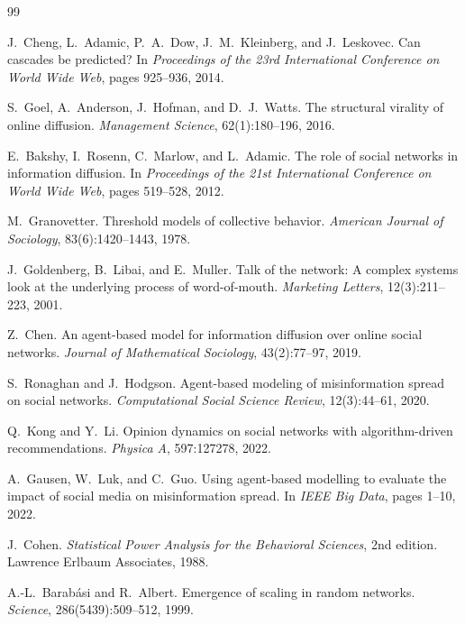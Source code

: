 \documentclass[sigconf, nonacm]{acmart}
\begin{document}

\begin{thebibliography}{99}

J.~Cheng, L.~Adamic, P.~A.~Dow, J.~M.~Kleinberg, and J.~Leskovec.
\newblock Can cascades be predicted?
\newblock In \emph{Proceedings of the 23rd International Conference on
World Wide Web}, pages 925--936, 2014.

S.~Goel, A.~Anderson, J.~Hofman, and D.~J.~Watts.
\newblock The structural virality of online diffusion.
\newblock \emph{Management Science}, 62(1):180--196, 2016.

E.~Bakshy, I.~Rosenn, C.~Marlow, and L.~Adamic.
\newblock The role of social networks in information diffusion.
\newblock In \emph{Proceedings of the 21st International Conference on
World Wide Web}, pages 519--528, 2012.

M.~Granovetter.
\newblock Threshold models of collective behavior.
\newblock \emph{American Journal of Sociology}, 83(6):1420--1443, 1978.

J.~Goldenberg, B.~Libai, and E.~Muller.
\newblock Talk of the network: A complex systems look at the underlying
process of word-of-mouth.
\newblock \emph{Marketing Letters}, 12(3):211--223, 2001.

Z.~Chen.
\newblock An agent-based model for information diffusion over online
social networks.
\newblock \emph{Journal of Mathematical Sociology}, 43(2):77--97, 2019.

S.~Ronaghan and J.~Hodgson.
\newblock Agent-based modeling of misinformation spread on social
networks.
\newblock \emph{Computational Social Science Review}, 12(3):44--61, 2020.

Q.~Kong and Y.~Li.
\newblock Opinion dynamics on social networks with algorithm-driven
recommendations.
\newblock \emph{Physica A}, 597:127278, 2022.

A.~Gausen, W.~Luk, and C.~Guo.
\newblock Using agent-based modelling to evaluate the impact of social
media on misinformation spread.
\newblock In \emph{IEEE Big Data}, pages 1--10, 2022.

J.~Cohen.
\newblock \emph{Statistical Power Analysis for the Behavioral Sciences},
2nd edition.
\newblock Lawrence Erlbaum Associates, 1988.

A.-L.~Barab\'{a}si and R.~Albert.
\newblock Emergence of scaling in random networks.
\newblock \emph{Science}, 286(5439):509--512, 1999.

\end{thebibliography}
\end{document}

